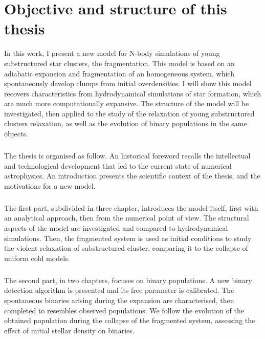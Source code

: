 
\chapter*{Objective and structure of this thesis}

In this work, I present a new model for N-body simulations of young substructured star clusters, the \HubLem fragmentation. This model is based on an adiabatic expansion and fragmentation of an homogeneous system, which spontaneously develop clumps from initial overdensities. I will show this model recovers characteristics from hydrodynamical simulations of star formation, which are much more computationally expansive. The structure of the \HubLem model will be investigated, then applied to the study of the relaxation of young substructured clusters relaxation, as well as the evolution of binary populations in the same objects. 

\paragraph*{}
The thesis is organised as follow. An historical foreword recalls the intellectual and technological development that led to the current state of numerical astrophysics. An introduction presents the scientific context of the thesis, and the motivations for a new model. 

\paragraph*{}
The first part, subdivided in three chapter, introduces the \HubLem model itself, first with an analytical approach, then from the numerical point of view. The structural aspects of the model are investigated and compared to hydrodynamical simulations. Then, the fragmented system is used as initial conditions to study the violent relaxation of substructured cluster, comparing it to the collapse of uniform cold models.

\paragraph*{}
The second part, in two chapters, focuses on binary populations. A new binary detection algorithm is presented and its free parameter is calibrated. The spontaneous binaries arising during the \HubLem expansion are characterised, then completed to resembles observed populations. We follow the evolution of the obtained population during the collapse of the fragmented system, assessing the effect of initial stellar density on binaries.

